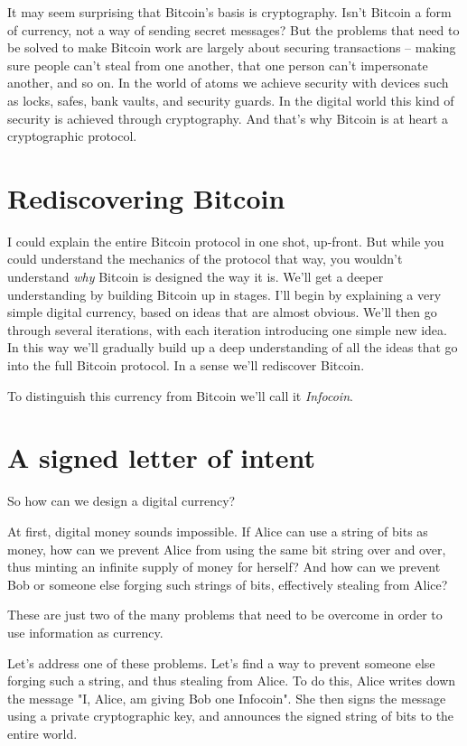 \documentclass[12pt]{book}
\newcounter{problem}[chapter]
\begin{document}
%
%
It may seem surprising that Bitcoin's basis is cryptography.  Isn't
Bitcoin a form of currency, not a way of sending secret messages?  But
the problems that need to be solved to make Bitcoin work are largely
about securing transactions -- making sure people can't steal from one
another, that one person can't impersonate another, and so on.  In the
world of atoms we achieve security with devices such as locks, safes,
bank vaults, and security guards.  In the digital world this kind of
security is achieved through cryptography.  And that's why Bitcoin is
at heart a cryptographic protocol.

\section{Rediscovering Bitcoin}

I could explain the entire Bitcoin protocol in one shot, up-front.
But while you could understand the mechanics of the protocol that way,
you wouldn't understand \emph{why} Bitcoin is designed the way it is.
We'll get a deeper understanding by building Bitcoin up in stages.
I'll begin by explaining a very simple digital currency, based on
ideas that are almost obvious.  We'll then go through several
iterations, with each iteration introducing one simple new idea.  In
this way we'll gradually build up a deep understanding of all the
ideas that go into the full Bitcoin protocol.  In a sense we'll
rediscover Bitcoin.


To distinguish this currency from
Bitcoin we'll call it \emph{Infocoin}.  

\section{A signed letter of intent}

So how can we design a digital currency?  

At first, digital money sounds impossible.  If Alice can use a string
of bits as money, how can we prevent Alice from using the same bit
string over and over, thus minting an infinite supply of money for
herself?  And how can we prevent Bob or someone else forging such
strings of bits, effectively stealing from Alice?

These are just two of the many problems that need to be overcome in
order to use information as currency.

Let's address one of these problems.  Let's find a way to prevent
someone else forging such a string, and thus stealing from Alice.  To
do this, Alice writes down the message "I, Alice, am giving Bob one
Infocoin".  She then signs the message using a private cryptographic
key, and announces the signed string of bits to the entire world.
\end{document}
